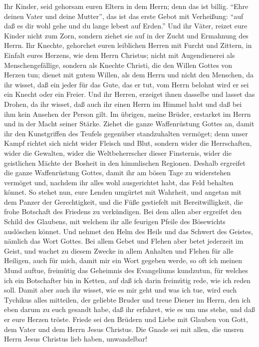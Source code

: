  Ihr Kinder, seid gehorsam euren Eltern in dem Herrn; denn
das ist billig.  ``Ehre deinen Vater und deine Mutter'',
das ist das erste Gebot mit Verheißung:  ``auf daß es dir
wohl gehe und du lange lebest auf Erden.''  Und ihr Väter,
reizet eure Kinder nicht zum Zorn, sondern ziehet sie auf in der Zucht
und Ermahnung des Herrn.  Ihr Knechte, gehorchet euren
leiblichen Herren mit Furcht und Zittern, in Einfalt eures Herzens, wie
dem Herrn Christus;  nicht mit Augendienerei als
Menschengefällige, sondern als Knechte Christi, die den Willen Gottes
von Herzen tun;  dienet mit gutem Willen, als dem Herrn
und nicht den Menschen,  da ihr wisset, daß ein jeder für
das Gute, das er tut, vom Herrn belohnt wird er sei ein Knecht oder ein
Freier.  Und ihr Herren, erzeiget ihnen dasselbe und
lasset das Drohen, da ihr wisset, daß auch ihr einen Herrn im Himmel
habt und daß bei ihm kein Ansehen der Person gilt.  Im
übrigen, meine Brüder, erstarket im Herrn und in der Macht seiner
Stärke.  Ziehet die ganze Waffenrüstung Gottes an, damit
ihr den Kunstgriffen des Teufels gegenüber standzuhalten vermöget;
 denn unser Kampf richtet sich nicht wider Fleisch und
Blut, sondern wider die Herrschaften, wider die Gewalten, wider die
Weltbeherrscher dieser Finsternis, wider die geistlichen Mächte der
Bosheit in den himmlischen Regionen.  Deshalb ergreifet
die ganze Waffenrüstung Gottes, damit ihr am bösen Tage zu widerstehen
vermöget und, nachdem ihr alles wohl ausgerichtet habt, das Feld
behalten könnet.  So stehet nun, eure Lenden umgürtet mit
Wahrheit, und angetan mit dem Panzer der Gerechtigkeit, 
und die Füße gestiefelt mit Bereitwilligkeit, die frohe Botschaft des
Friedens zu verkündigen.  Bei dem allen aber ergreifet
den Schild des Glaubens, mit welchem ihr alle feurigen Pfeile des
Bösewichts auslöschen könnet.  Und nehmet den Helm des
Heils und das Schwert des Geistes, nämlich das Wort Gottes.
 Bei allem Gebet und Flehen aber betet jederzeit im
Geist, und wachet zu diesem Zwecke in allem Anhalten und Flehen für alle
Heiligen,  auch für mich, damit mir ein Wort gegeben
werde, so oft ich meinen Mund auftue, freimütig das Geheimnis des
Evangeliums kundzutun,  für welches ich ein Botschafter
bin in Ketten, auf daß ich darin freimütig rede, wie ich reden soll.
 Damit aber auch ihr wisset, wie es mir geht und was ich
tue, wird euch Tychikus alles mitteilen, der geliebte Bruder und treue
Diener im Herrn,  den ich eben darum zu euch gesandt
habe, daß ihr erfahret, wie es um uns stehe, und daß er eure Herzen
tröste.  Friede sei den Brüdern und Liebe mit Glauben von
Gott, dem Vater und dem Herrn Jesus Christus.  Die Gnade
sei mit allen, die unsren Herrn Jesus Christus lieb haben, unwandelbar!
